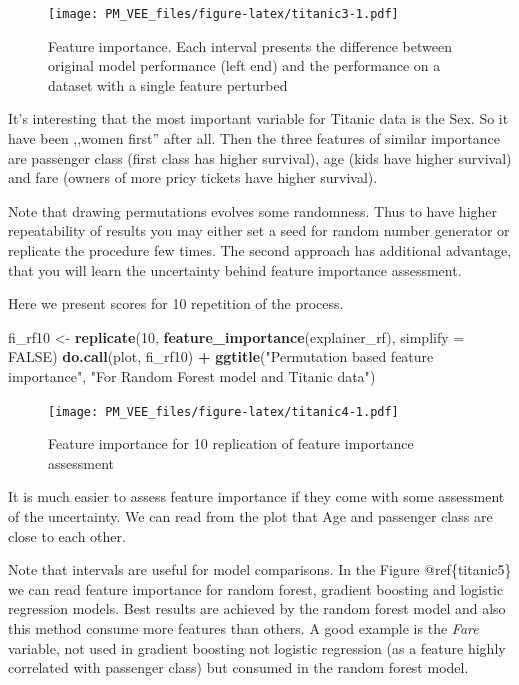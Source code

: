 \documentclass[]{krantz}
\newenvironment{Shaded}{\begin{snugshade}}{\end{snugshade}}
\newcommand{\DataTypeTok}[1]{\textcolor[rgb]{0.13,0.29,0.53}{#1}}
\newcommand{\DecValTok}[1]{\textcolor[rgb]{0.00,0.00,0.81}{#1}}
\newcommand{\KeywordTok}[1]{\textcolor[rgb]{0.13,0.29,0.53}{\textbf{#1}}}
\newcommand{\NormalTok}[1]{#1}
\newcommand{\OperatorTok}[1]{\textcolor[rgb]{0.81,0.36,0.00}{\textbf{#1}}}
\newcommand{\OtherTok}[1]{\textcolor[rgb]{0.56,0.35,0.01}{#1}}
\newcommand{\StringTok}[1]{\textcolor[rgb]{0.31,0.60,0.02}{#1}}
\theoremstyle{definition}
\theoremstyle{definition}
\theoremstyle{definition}
\theoremstyle{remark}
\begin{document}
\begin{figure}
\centering
\texttt{[image: PM\_VEE\_files/figure-latex/titanic3-1.pdf]}
\caption{\label{fig:titanic3}Feature importance. Each interval presents the
difference between original model performance (left end) and the
performance on a dataset with a single feature perturbed}
\end{figure}

It's interesting that the most important variable for Titanic data is
the Sex. So it have been ,,women first'' after all. Then the three
features of similar importance are passenger class (first class has
higher survival), age (kids have higher survival) and fare (owners of
more pricy tickets have higher survival).

Note that drawing permutations evolves some randomness. Thus to have
higher repeatability of results you may either set a seed for random
number generator or replicate the procedure few times. The second
approach has additional advantage, that you will learn the uncertainty
behind feature importance assessment.

Here we present scores for 10 repetition of the process.

\begin{Shaded}
\begin{Highlighting}[]
\NormalTok{fi_rf10 <-}\StringTok{ }\KeywordTok{replicate}\NormalTok{(}\DecValTok{10}\NormalTok{, }\KeywordTok{feature_importance}\NormalTok{(explainer_rf), }\DataTypeTok{simplify =} \OtherTok{FALSE}\NormalTok{)}
\KeywordTok{do.call}\NormalTok{(plot, fi_rf10) }\OperatorTok{+}\StringTok{ }\KeywordTok{ggtitle}\NormalTok{(}\StringTok{"Permutation based feature importance"}\NormalTok{, }\StringTok{"For Random Forest model and Titanic data"}\NormalTok{)}
\end{Highlighting}
\end{Shaded}

\begin{figure}
\centering
\texttt{[image: PM\_VEE\_files/figure-latex/titanic4-1.pdf]}
\caption{\label{fig:titanic4}Feature importance for 10 replication of
feature importance assessment}
\end{figure}

It is much easier to assess feature importance if they come with some
assessment of the uncertainty. We can read from the plot that Age and
passenger class are close to each other.

Note that intervals are useful for model comparisons. In the Figure
@ref\{titanic5\} we can read feature importance for random forest,
gradient boosting and logistic regression models. Best results are
achieved by the random forest model and also this method consume more
features than others. A good example is the \emph{Fare} variable, not
used in gradient boosting not logistic regression (as a feature highly
correlated with passenger class) but consumed in the random forest
model.
\end{document}
